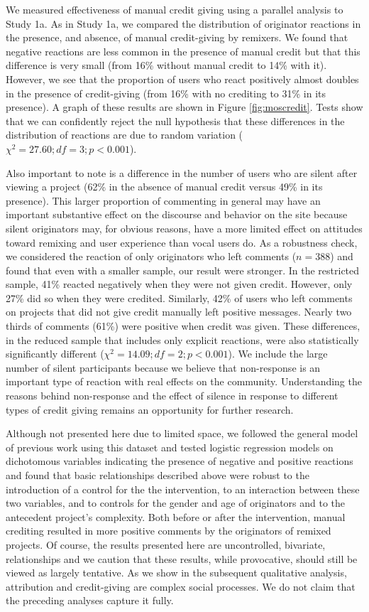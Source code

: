We measured effectiveness of manual credit giving using a parallel
analysis to Study 1a. As in Study 1a, we compared the distribution of
originator reactions in the presence, and absence, of manual
credit-giving by remixers. We found that negative reactions are less
common in the presence of manual credit but that this difference is
very small (from 16\% without manual credit to 14\% with it). However,
we see that the proportion of users who react positively almost
doubles in the presence of credit-giving (from 16\% with no crediting
to 31\% in its presence). A graph of these results are shown
in Figure \ref{fig:moscredit}. Tests show that we can confidently
reject the null hypothesis that these differences in the distribution
of reactions are due to random variation ($\chi^2 = 27.60; df=3;
p<0.001$).

Also important to note is a difference in the number of users who are
silent after viewing a project (62\% in the absence of manual credit
versus 49\% in its presence). This larger proportion of commenting in
general may have an important substantive effect on the discourse and
behavior on the site because silent originators may, for obvious
reasons, have a more limited effect on attitudes toward remixing and
user experience than vocal users do. As a robustness check, we
considered the reaction of only originators who left comments
($n=388$) and found that even with a smaller sample, our result were
stronger. In the restricted sample, 41\% reacted negatively when they
were not given credit.  However, only 27\% did so when they were
credited. Similarly, 42\% of users who left comments on projects that
did not give credit manually left positive messages. Nearly two thirds
of comments (61\%) were positive when credit was given.  These
differences, in the reduced sample that includes only explicit
reactions, were also statistically significantly different ($\chi^2 =
14.09; df=2; p<0.001$). We include the large number of silent
participants because we believe that non-response is an important type
of reaction with real effects on the community. Understanding the
reasons behind non-response and the effect of silence in response to
different types of credit giving remains an opportunity for further
research.

Although not presented here due to limited space, we followed the
general model of previous work using this dataset
\cite{hill_responses_2010} and tested logistic regression models on
dichotomous variables indicating the presence of negative and positive
reactions and found that basic relationships described above were
robust to the introduction of a control for the the intervention, to
an interaction between these two variables, and to controls for the
gender and age of originators and to the antecedent project's
complexity. Both before or after the intervention, manual crediting
resulted in more positive comments by the originators of remixed
projects. Of course, the results presented here are uncontrolled,
bivariate, relationships and we caution that these results, while
provocative, should still be viewed as largely tentative. As we show
in the subsequent qualitative analysis, attribution and credit-giving
are complex social processes. We do not claim that the preceding
analyses capture it fully.


